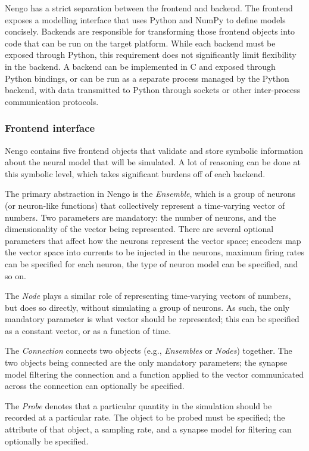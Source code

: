 \documentclass{frontiersSCNS}
\begin{document}
Nengo has a strict separation between
the frontend and backend.
The frontend exposes a modelling interface
that uses Python and NumPy \cite{???}
to define models concisely.
Backends are responsible for transforming
those frontend objects into code that
can be run on the target platform.
While each backend must be exposed
through Python, this requirement
does not significantly limit
flexibility in the backend.
A backend can be implemented in C and exposed
through Python bindings,
or can be run as a separate process
managed by the Python backend,
with data transmitted to Python through sockets
or other inter-process communication protocols.

\subsubsection{Frontend interface}

Nengo contains five frontend objects
that validate and store symbolic information
about the neural model that will be simulated.
A lot of reasoning can be done at this symbolic level,
which takes significant burdens off of each backend.

The primary abstraction in Nengo is the \textit{Ensemble},
which is a group of neurons (or neuron-like functions)
that collectively represent a time-varying vector of numbers.
Two parameters are mandatory: the number of neurons,
and the dimensionality of the vector being represented.
There are several optional parameters that
affect how the neurons represent the vector space;
encoders map the vector space into currents
to be injected in the neurons,
maximum firing rates can be specified for each neuron,
the type of neuron model can be specified,
and so on.

The \textit{Node} plays a similar role of representing
time-varying vectors of numbers,
but does so directly, without simulating a group of neurons.
As such, the only mandatory parameter
is what vector should be represented;
this can be specified as a constant vector,
or as a function of time.

The \textit{Connection} connects two objects
(e.g., \textit{Ensembles} or \textit{Nodes}) together.
The two objects being connected are the only mandatory parameters;
the synapse model filtering the connection
and a function applied to the vector
communicated across the connection
can optionally be specified.

The \textit{Probe} denotes that a particular
quantity in the simulation should be recorded
at a particular rate.
The object to be probed must be specified;
the attribute of that object,
a sampling rate, and a synapse model for filtering
can optionally be specified.
\end{document}
